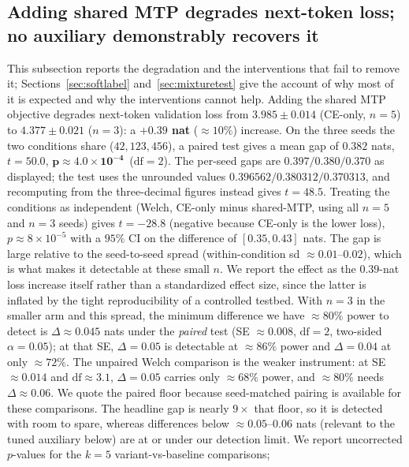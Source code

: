 \subsection{Adding shared MTP degrades next-token loss; no auxiliary demonstrably recovers it}
\label{sec:interventions}
This subsection reports the degradation and the interventions that fail to remove
it; Sections~\ref{sec:softlabel} and~\ref{sec:mixturetest} give the account of why
most of it is expected and why the interventions cannot help.
Adding the shared MTP objective degrades next-token validation loss from
$\mathbf{3.985 \pm 0.014}$ (CE-only, $n{=}5$) to $\mathbf{4.377 \pm 0.021}$
($n{=}3$): a \textbf{$+0.39$ nat} (${\approx}10\%$) increase. On the three seeds
the two conditions share ($42,123,456$), a paired test gives a mean gap of
$\mathbf{0.382}$ nats, $t{=}50.0$, $\mathbf{p \approx 4.0\times10^{-4}}$\ ($\text{df}{=}2$). The per-seed gaps are $0.397/0.380/0.370$ as displayed; the
test uses the unrounded values $0.396562/0.380312/0.370313$, and recomputing from
the three-decimal figures instead gives $t{=}48.5$. Treating the conditions as
independent (Welch, CE-only minus shared-MTP, using all $n{=}5$ and $n{=}3$
seeds) gives $t = -28.8$ (negative because CE-only is the lower loss),
$p \approx 8\times10^{-5}$ with a $95\%$ CI on the difference of
$[0.35, 0.43]$ nats. The gap is large relative to the seed-to-seed spread (within-condition sd $\approx 0.01$--$0.02$), which is what makes it detectable at these small $n$. We report the effect as the $0.39$-nat loss increase itself rather than a standardized effect size, since the latter is inflated by the tight reproducibility of a controlled testbed. With $n{=}3$ in the smaller arm and this
spread, the minimum difference we have ${\approx}80\%$ power to detect is
$\Delta\approx0.045$ nats under the \emph{paired} test (SE $\approx 0.008$,
$\mathrm{df}{=}2$, two-sided $\alpha{=}0.05$); at that SE, $\Delta{=}0.05$ is
detectable at ${\approx}86\%$ power and $\Delta{=}0.04$ at only ${\approx}72\%$.
The unpaired Welch comparison is the weaker instrument: at SE $\approx 0.014$ and
$\mathrm{df}\approx3.1$, $\Delta{=}0.05$ carries only ${\approx}68\%$ power, and
${\approx}80\%$ needs $\Delta\approx0.06$. We quote the
paired floor because seed-matched pairing is available for these comparisons. The
headline gap is nearly $9\times$ that floor, so it is detected with room to spare,
whereas differences below ${\approx}0.05$--$0.06$ nats
(relevant to the tuned auxiliary below) are at or under our detection limit. We
report uncorrected $p$-values for the $k{=}5$ variant-vs-baseline comparisons;
